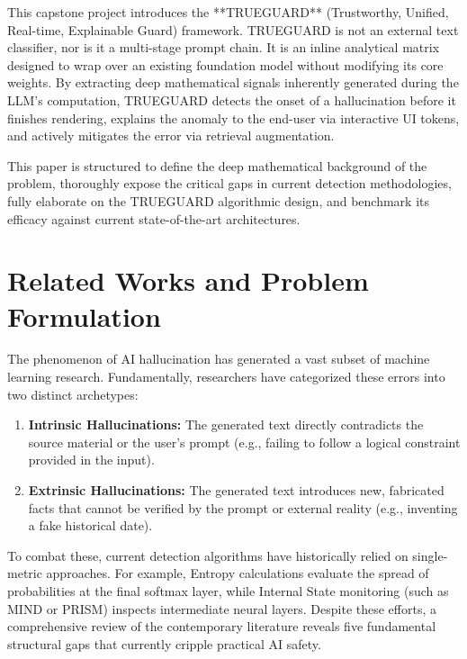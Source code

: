 \documentclass{article}
\begin{document}
This capstone project introduces the **TRUEGUARD** (Trustworthy, Unified, Real-time, Explainable Guard) framework. TRUEGUARD is not an external text classifier, nor is it a multi-stage prompt chain. It is an inline analytical matrix designed to wrap over an existing foundation model without modifying its core weights. By extracting deep mathematical signals inherently generated during the LLM's computation, TRUEGUARD detects the onset of a hallucination before it finishes rendering, explains the anomaly to the end-user via interactive UI tokens, and actively mitigates the error via retrieval augmentation.

This paper is structured to define the deep mathematical background of the problem, thoroughly expose the critical gaps in current detection methodologies, fully elaborate on the TRUEGUARD algorithmic design, and benchmark its efficacy against current state-of-the-art architectures.

\section{Related Works and Problem Formulation}
\label{sec:related}

The phenomenon of AI hallucination has generated a vast subset of machine learning research. Fundamentally, researchers have categorized these errors into two distinct archetypes:
\begin{enumerate}
    \item \textbf{Intrinsic Hallucinations:} The generated text directly contradicts the source material or the user's prompt (e.g., failing to follow a logical constraint provided in the input).
    \item \textbf{Extrinsic Hallucinations:} The generated text introduces new, fabricated facts that cannot be verified by the prompt or external reality (e.g., inventing a fake historical date).
\end{enumerate}

To combat these, current detection algorithms have historically relied on single-metric approaches. For example, Entropy calculations evaluate the spread of probabilities at the final softmax layer, while Internal State monitoring (such as MIND or PRISM) inspects intermediate neural layers. Despite these efforts, a comprehensive review of the contemporary literature reveals five fundamental structural gaps that currently cripple practical AI safety.
\end{document}
